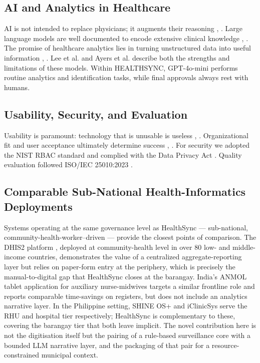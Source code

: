 \documentclass[conference]{IEEEtran}
\begin{document}
\subsection{AI and Analytics in Healthcare}
AI is not intended to replace physicians; it augments their reasoning \cite{b3}, \cite{b4}. Large language models are well documented to encode extensive clinical knowledge \cite{b20}, \cite{b21}. The promise of healthcare analytics lies in turning unstructured data into useful information \cite{b22}, \cite{b23}. Lee et al. \cite{b24} and Ayers et al. \cite{b25} describe both the strengths and limitations of these models. Within HEALTHSYNC, GPT-4o-mini performs routine analytics and identification tasks, while final approvals always rest with humans.

\subsection{Usability, Security, and Evaluation}
Usability is paramount: technology that is unusable is useless \cite{b26}, \cite{b27}. Organizational fit and user acceptance ultimately determine success \cite{b28}, \cite{b29}. For security we adopted the NIST RBAC standard \cite{b30} and complied with the Data Privacy Act \cite{b6}. Quality evaluation followed ISO/IEC 25010:2023 \cite{b31}.

\subsection{Comparable Sub-National Health-Informatics Deployments}
Systems operating at the same governance level as HealthSync --- sub-national, community-health-worker--driven --- provide the closest points of comparison. The DHIS2 platform \cite{b53}, deployed at community-health level in over 80 low- and middle-income countries, demonstrates the value of a centralized aggregate-reporting layer but relies on paper-form entry at the periphery, which is precisely the manual-to-digital gap that HealthSync closes at the barangay. India's ANMOL tablet application for auxiliary nurse-midwives \cite{b54} targets a similar frontline role and reports comparable time-savings on registers, but does not include an analytics narrative layer. In the Philippine setting, SHINE OS+ and iClinicSys \cite{b55} serve the RHU and hospital tier respectively; HealthSync is complementary to these, covering the barangay tier that both leave implicit. The novel contribution here is not the digitisation itself but the pairing of a rule-based surveillance core with a bounded LLM narrative layer, and the packaging of that pair for a resource-constrained municipal context.
\end{document}
